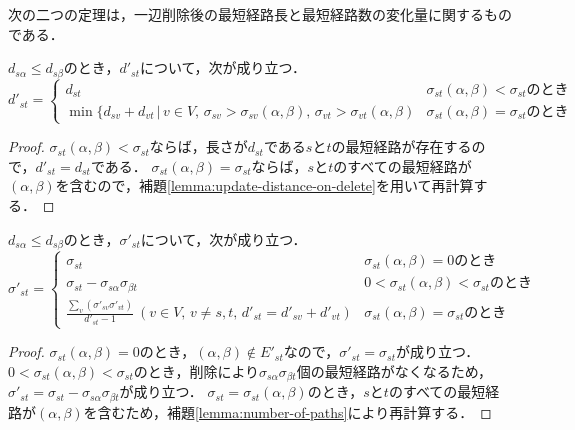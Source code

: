 次の二つの定理は，一辺削除後の最短経路長と最短経路数の変化量に関するものである．
\begin{theorem}
  \label{thm:update-distance-on-delete}
  $d_{s\alpha}\leq d_{s\beta}$のとき，$d'_{st}$について，次が成り立つ．
  \begin{equation*}
    d'_{st}=
    \begin{cases}
      d_{st} & \sigma_{st}(\alpha,\beta)<\sigma_{st} のとき \\
      \min\{d_{sv}+d_{vt}\,|\,v\in V,\,\sigma_{sv}>\sigma_{sv}(\alpha,\beta),\,\sigma_{vt}>\sigma_{vt}(\alpha,\beta) & \sigma_{st}(\alpha,\beta)=\sigma_{st} のとき
    \end{cases}
  \end{equation*}
\end{theorem}
\begin{proof}
  $\sigma_{st}(\alpha,\beta)<\sigma_{st}$ならば，長さが$d_{st}$である$s$と$t$の最短経路が存在するので，$d'_{st}=d_{st}$である．  $\sigma_{st}(\alpha,\beta)=\sigma_{st}$ならば，$s$と$t$のすべての最短経路が$(\alpha,\beta)$を含むので，補題\ref{lemma:update-distance-on-delete}を用いて再計算する．
\end{proof}
\begin{theorem}
  \label{thm:update-pathnum-on-delete}
  $d_{s\alpha}\leq d_{s\beta}$のとき，$\sigma'_{st}$について，次が成り立つ．
  \begin{equation*}
    \sigma'_{st}=
    \begin{cases}
      \sigma_{st} & \sigma_{st}(\alpha,\beta)=0 のとき \\
      \sigma_{st}-\sigma_{s\alpha}\sigma_{\beta t} & 0<\sigma_{st}(\alpha,\beta)<\sigma_{st} のとき \\
      \frac{\sum_v(\sigma'_{sv}\sigma'_{vt})}{d'_{st}-1}\:(v\in V,\,v\neq s,t,\,d'_{st}=d'_{sv}+d'_{vt}) & \sigma_{st}(\alpha,\beta)=\sigma_{st} のとき
    \end{cases}
  \end{equation*}
\end{theorem}
\begin{proof}
  $\sigma_{st}(\alpha,\beta)=0$のとき，$(\alpha,\beta)\notin E'_{st}$なので，$\sigma'_{st}=\sigma_{st}$が成り立つ．
  $0<\sigma_{st}(\alpha,\beta)<\sigma_{st}$のとき，削除により$\sigma_{s\alpha}\sigma_{\beta t}$個の最短経路がなくなるため，$\sigma'_{st}=\sigma_{st}-\sigma_{s\alpha}\sigma_{\beta t}$が成り立つ．
  $\sigma_{st}=\sigma_{st}(\alpha,\beta)$のとき，$s$と$t$のすべての最短経路が$(\alpha,\beta)$を含むため，補題\ref{lemma:number-of-paths}により再計算する．
\end{proof}

